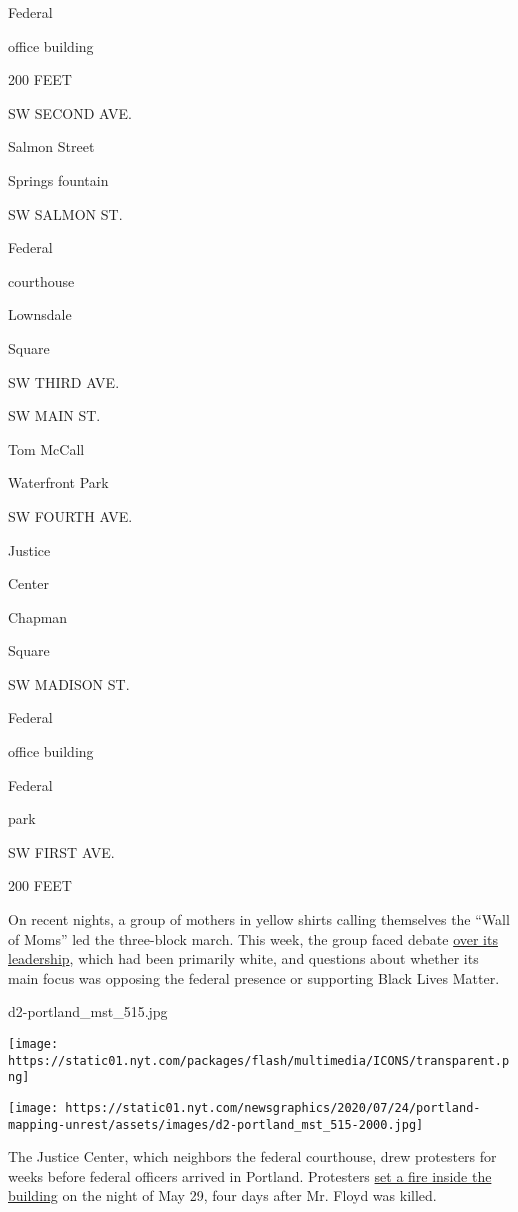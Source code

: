 Federal

office building

200 FEET

SW SECOND AVE.

Salmon Street

Springs fountain

SW SALMON ST.

Federal

courthouse

Lownsdale

Square

SW THIRD AVE.

SW MAIN ST.

Tom McCall

Waterfront Park

SW FOURTH AVE.

Justice

Center

Chapman

Square

SW MADISON ST.

Federal

office building

Federal

park

SW FIRST AVE.

200 FEET

On recent nights, a group of mothers in yellow shirts calling themselves
the ``Wall of Moms'' led the three-block march. This week, the group
faced debate
\href{https://www.oregonlive.com/news/2020/07/portlands-wall-of-moms-crumbles-amid-online-allegations-by-former-partner-dont-shoot-pdx.html}{over
its leadership}, which had been primarily white, and questions about
whether its main focus was opposing the federal presence or supporting
Black Lives Matter.

d2-portland\_mst\_515.jpg

\texttt{[image: https://static01.nyt.com/packages/flash/multimedia/ICONS/transparent.png]}

\texttt{[image: https://static01.nyt.com/newsgraphics/2020/07/24/portland-mapping-unrest/assets/images/d2-portland\_mst\_515-2000.jpg]}

The Justice Center, which neighbors the federal courthouse, drew
protesters for weeks before federal officers arrived in Portland.
Protesters
\href{https://www.oregonlive.com/crime/2020/07/32-year-old-man-faces-federal-arson-charge-stemming-from-fire-inside-justice-center.html}{set
a fire inside the building} on the night of May 29, four days after Mr.
Floyd was killed.

